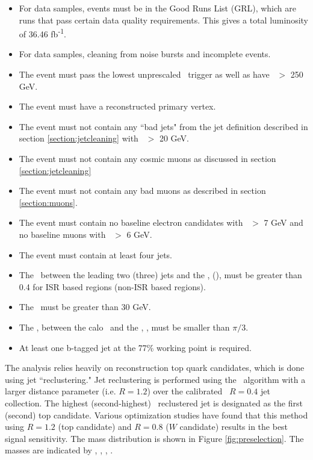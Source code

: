 \begin{itemize}
	\item For data samples, events must be in the Good Runs List (GRL), which are runs that pass certain data quality requirements.  This gives a total luminosity of 36.46 fb\textsuperscript{-1}.
	\item For data samples, cleaning from noise bursts and incomplete events.
	\item The event must pass the lowest unprescaled \met\ trigger as well as have \met\ $>$ 250 GeV.
	\item The event must have a reconstructed primary vertex.
	\item The event must not contain any ``bad jets" from the jet definition described in section \ref{section:jetcleaning} with \pt\ $>$ 20 GeV. %
	\item The event must not contain any cosmic muons as discussed in section \ref{section:jetcleaning}
	\item The event must not contain any bad muons as described in section \ref{section:muons}.
	\item The event must contain no baseline electron candidates with \pt\ $>$ 7 GeV and no baseline muons with \pt\ $>$ 6 GeV.
	\item The event must contain at least four jets.
	\item The \dphi\ between the leading two (three) jets and the \met, \dphijettwomet (\dphijetthreemet), must be greater than 0.4 for ISR based regions (non-ISR based regions). 
	\item The \mettrk\ must be greater than 30 GeV.
	\item The \dphi, between the calo \met\ and the \mettrk, \dphimettrk, must be smaller than $\pi/3$.
\item At least one b-tagged jet at the 77\% working point is required.
\end{itemize}

The analysis relies heavily on reconstruction top quark candidates, which is done using jet ``reclustering."  Jet reclustering is performed using the \antikt\ algorithm with a larger distance parameter (i.e. $R=1.2$) over the calibrated \antikt\ $R=0.4$ jet collection. The highest (second-highest) \pT\ reclustered jet is designated as the first (second) top candidate. Various optimization studies have found that this method using $R=1.2$ (top candidate) and $R=0.8$ ($W$ candidate) results in the best signal sensitivity. The mass distribution is shown in Figure \ref{fig:preselection}.  The masses are indicated by \mantikttwelvezero, \mantikttwelveone, \mantikteightzero, \mantikteightone. \\




